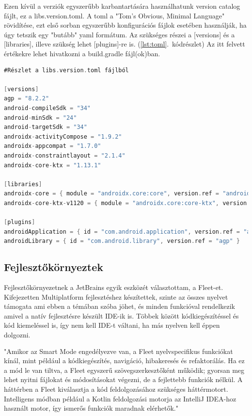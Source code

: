 Ezen kívül a verziók egyszerűbb karbantartására használhatunk version catalog fájlt, ez a libs.version.toml.
A toml a "Tom's Obvious, Minimal Language" rövidítése, ezt első sorban egyszerűbb konfigurációs fájlok esetében használják, ha úgy tetszik egy "butább" yaml formátum.
Az szükséges részei a [versions] és a [libraries], illeve szükség lehet [plugins]-re is. (\ref{lst:toml}.~kódrészlet) Az itt felvett értékekre lehet hivatkozni a build.gradle fájl(ok)ban.

\begin{lstlisting}[caption={Version catalog}, label={lst:toml}, language=Kotlin]
#Részlet a libs.version.toml fájlból

[versions]
agp = "8.2.2"
android-compileSdk = "34"
android-minSdk = "24"
android-targetSdk = "34"
androidx-activityCompose = "1.9.2"
androidx-appcompat = "1.7.0"
androidx-constraintlayout = "2.1.4"
androidx-core-ktx = "1.13.1"

[libraries]
androidx-core = { module = "androidx.core:core", version.ref = "androidx-core-ktx" }
androidx-core-ktx-v1120 = { module = "androidx.core:core-ktx", version.ref = "coreKtx" }

[plugins]
androidApplication = { id = "com.android.application", version.ref = "agp" }
androidLibrary = { id = "com.android.library", version.ref = "agp" }
\end{lstlisting}


\subsection{Fejlesztőkörnyeztek}

Fejlesztőkörnyezetnek a JetBrains egyik eszközét választottam, a Fleet-et.
Kifejezetten Multiplatform fejlesztéshez készítettek, szinte az összes nyelvet támogata ami ebben a témában szóba jöhet, és minden funkcióval rendelkezik amivel a natív fejlesztésre készült IDE-ik is.
Többek között kódkiegészítéssel és kód kiemeléssel is, így nem kell IDE-t váltani, ha más nyelven kell éppen dolgozni.

"Amikor az Smart Mode engedélyezve van, a Fleet nyelvspecifikus funkciókat kínál, mint például a kódkiegészítés, navigáció, hibakeresés és refaktorálás. Ha ez a mód le van tiltva, a Fleet egyszerű szövegszerkesztőként működik; gyorsan meg lehet nyitni fájlokat és módosításokat végezni, de a fejlettebb funkciók nélkül. A háttérben a Fleet kiválasztja a kód feldolgozásához szükséges háttérmotort. Intelligens módban például a Kotlin feldolgozási motorja az IntelliJ IDEA-hoz használt motor, így ismerős funkciók maradnak elérhetők." \cite{Fleet}

